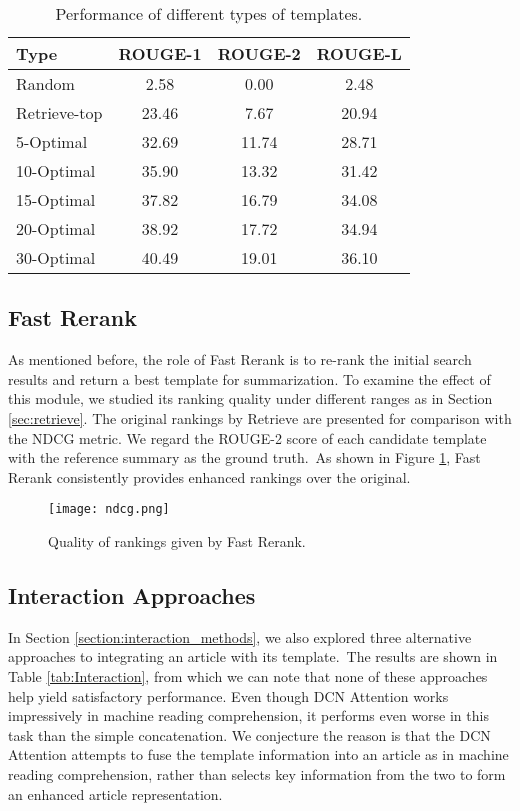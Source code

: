 \documentclass[11pt,a4paper]{article}
\begin{document}
\begin{spacing}{1.0}
\begin{table}[h]
\small

	\centering
	\begin{tabular}{@{}l|ccc@{}}
		\toprule
        Type     & ROUGE-1   & ROUGE-2  & ROUGE-L   \\
        \hline
		Random       & 2.58 & 0.00 & 2.48 \\
		Retrieve-top      & 23.46 & 7.67 & 20.94 \\
		5\textrm{-}Optimal  & 32.69 & 11.74 & 28.71 \\
        10\textrm{-}Optimal  & 35.90 & 13.32 & 31.42 \\
        15\textrm{-}Optimal  & 37.82 & 16.79 & 34.08 \\
        20\textrm{-}Optimal  & 38.92 & 17.72 & 34.94 \\
        30\textrm{-}Optimal  & 40.49 & 19.01 & 36.10 \\
        \bottomrule
	\end{tabular}
	\caption{Performance of different types of templates.}
	\label{tab:Retrieve}
\end{table}



\subsection{Fast Rerank}\label{sec:fast rerank result}
As mentioned before, the role of Fast Rerank is to re-rank the initial search results and return a best template for summarization. To examine the effect of this module, we studied its ranking quality under different ranges as in Section \ref{sec:retrieve}. The original rankings by Retrieve are presented for comparison with the NDCG metric. We regard the ROUGE-2 score of each candidate template with the reference summary as the ground truth.~As shown in Figure \ref{img:ndcg}, Fast Rerank consistently provides enhanced rankings over the original.

\begin{figure}
\centering
\texttt{[image: ndcg.png]}
\caption{Quality of rankings given by Fast Rerank.}
\label{img:ndcg}
\end{figure}


\subsection{Interaction Approaches}
In Section \ref{section:interaction_methods}, we also explored three alternative approaches to integrating an article with its template.~The results are shown in Table \ref{tab:Interaction}, from which we can note that none of these approaches help yield satisfactory performance. Even though DCN Attention works impressively in machine reading comprehension, it performs even worse in this task than the simple concatenation. We conjecture the reason is that the DCN Attention attempts to fuse the template information into an article as in machine reading comprehension, rather than  selects key information from the two to form an enhanced article representation.


\end{spacing}
\end{document}
